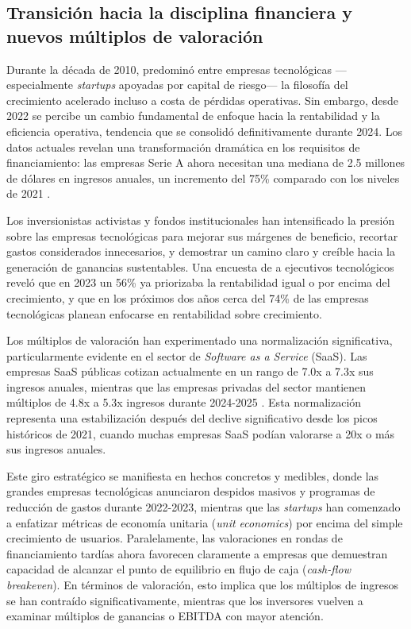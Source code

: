 \subsection{Transición hacia la disciplina financiera y nuevos múltiplos de valoración}

Durante la década de 2010, predominó entre empresas tecnológicas ---especialmente \emph{startups} apoyadas por capital de riesgo--- la filosofía del crecimiento acelerado incluso a costa de pérdidas operativas. Sin embargo, desde 2022 se percibe un cambio fundamental de enfoque hacia la rentabilidad y la eficiencia operativa, tendencia que se consolidó definitivamente durante 2024. Los datos actuales revelan una transformación dramática en los requisitos de financiamiento: las empresas Serie A ahora necesitan una mediana de 2.5 millones de dólares en ingresos anuales, un incremento del 75\% comparado con los niveles de 2021 \citep{carta2024}.

Los inversionistas activistas y fondos institucionales han intensificado la presión sobre las empresas tecnológicas para mejorar sus márgenes de beneficio, recortar gastos considerados innecesarios, y demostrar un camino claro y creíble hacia la generación de ganancias sustentables. Una encuesta de \cite{alixpartners2023} a ejecutivos tecnológicos reveló que en 2023 un 56\% ya priorizaba la rentabilidad igual o por encima del crecimiento, y que en los próximos dos años cerca del 74\% de las empresas tecnológicas planean enfocarse en rentabilidad sobre crecimiento.

Los múltiplos de valoración han experimentado una normalización significativa, particularmente evidente en el sector de \emph{Software as a Service} (SaaS). Las empresas SaaS públicas cotizan actualmente en un rango de 7.0x a 7.3x sus ingresos anuales, mientras que las empresas privadas del sector mantienen múltiplos de 4.8x a 5.3x ingresos durante 2024-2025 \citep{saasmetrics2024}. Esta normalización representa una estabilización después del declive significativo desde los picos históricos de 2021, cuando muchas empresas SaaS podían valorarse a 20x o más sus ingresos anuales.

Este giro estratégico se manifiesta en hechos concretos y medibles, donde las grandes empresas tecnológicas anunciaron despidos masivos y programas de reducción de gastos durante 2022-2023, mientras que las \emph{startups} han comenzado a enfatizar métricas de economía unitaria (\emph{unit economics}) por encima del simple crecimiento de usuarios. Paralelamente, las valoraciones en rondas de financiamiento tardías ahora favorecen claramente a empresas que demuestran capacidad de alcanzar el punto de equilibrio en flujo de caja (\emph{cash-flow breakeven}). En términos de valoración, esto implica que los múltiplos de ingresos se han contraído significativamente, mientras que los inversores vuelven a examinar múltiplos de ganancias o EBITDA con mayor atención.

